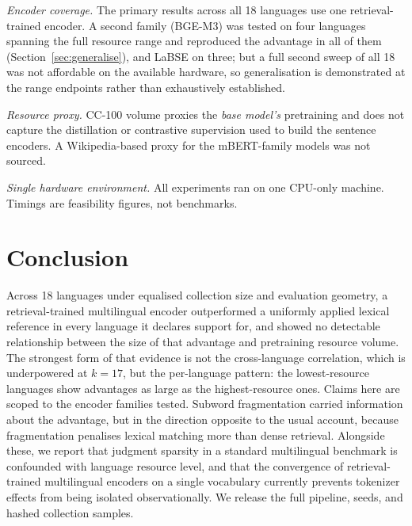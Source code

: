 \documentclass{ijimai_article}
\begin{document}
\emph{Encoder coverage.} The primary results across all 18 languages use one
retrieval-trained encoder. A second family (BGE-M3) was tested on four languages
spanning the full resource range and reproduced the advantage in all of them
(Section~\ref{sec:generalise}), and LaBSE on three; but a full second sweep of all 18
was not affordable on the available hardware, so generalisation is demonstrated at the
range endpoints rather than exhaustively established.

\emph{Resource proxy.} CC-100 volume proxies the \emph{base model's} pretraining
and does not capture the distillation or contrastive supervision used to build the
sentence encoders. A Wikipedia-based proxy for the mBERT-family models was not
sourced.

\emph{Single hardware environment.} All experiments ran on one CPU-only machine.
Timings are feasibility figures, not benchmarks.

\section{Conclusion}

Across 18 languages under equalised collection size and evaluation geometry, a
retrieval-trained multilingual encoder outperformed a uniformly applied lexical
reference in every language it declares support for, and showed no detectable
relationship between the size of that advantage and pretraining resource volume.
The strongest form of that evidence is not the cross-language correlation, which is
underpowered at $k{=}17$, but the per-language pattern: the lowest-resource
languages show advantages as large as the highest-resource ones. Claims here are
scoped to the encoder families tested. Subword fragmentation carried
information about the advantage, but in the direction opposite to the usual
account, because fragmentation penalises lexical matching more than dense
retrieval. Alongside these, we report that judgment sparsity in a standard
multilingual benchmark is confounded with language resource level, and that the
convergence of retrieval-trained multilingual encoders on a single vocabulary
currently prevents tokenizer effects from being isolated observationally. We
release the full pipeline, seeds, and hashed collection samples.

\appenAcknow
\end{document}
